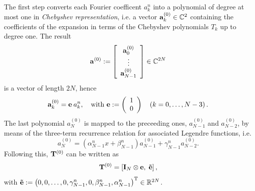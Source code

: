 The first step converts each Fourier coefficent $a_{k}^n$ into a polynomial of degree at 
most one in \emph{Chebyshev representation}, i.e. a vector $\mathbf{a}_{k}^{(0)} \in \mathbb{C}^2$ containing 
the coefficients of the expansion in terms of the Chebyshev polynomials $T_{k}$ up to 
degree one. The result 
\[
  \mathbf{a}^{(0)} := 
    \left[\begin{array}{c}
      \mathbf{a}_{0}^{(0)}\\
      \vdots\\
      \mathbf{a}_{N-1}^{(0)}
    \end{array}\right] 
    \in \mathbb{C}^{2N}
\] 
is a vector of length $2N$, hence 
\[ 
  \mathbf{a}_{k}^{(0)} = \mathbf{e} \: a_{k}^n,\quad \text{with } \mathbf{e} := \left(\begin{array}{l}1\\0\end{array}\right) \quad \left(k = 0,\ldots,N-3\right).
\]
The last polynomial $a_{N}^{(0)}$ is mapped to the preceeding ones, $a_{N-1}^{(0)}$ and $a_{N-2}^{(0)}$, by means of the three-term 
recurrence relation for associated Legendre functions, i.e. 
\[
  a_{N}^{(0)} = \left(\alpha_{N-1}^n x + \beta_{N-1}^n\right)a_{N-1}^{(0)} + \gamma_{N-1}^n a_{N-2}^{(0)}.
\]
Following this, $\mathbf{T}^{(0)}$ can be written as 
\[
  \mathbf{T}^{(0)} = \left[\mathbf{I}_{N} \otimes \mathbf{e},\;\mathbf{\tilde{e}}\right],
\]
with $\mathbf{\tilde{e}} := \left(0,0,\dots,0,\gamma_{N-1}^n, 0, \beta_{N-1}^n,\alpha_{N-1}^n\right)^{\text{\rm{T}}} \in \mathbb{R}^{2N}$.

